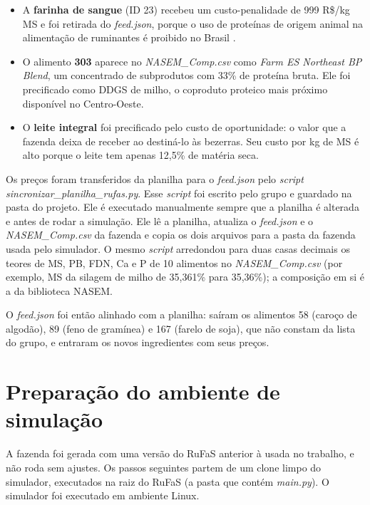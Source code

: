 \documentclass[a4paper,12pt]{article}
\begin{document}
\begin{itemize}
    \item A \textbf{farinha de sangue} (ID 23) recebeu um custo-penalidade de 999 R\$/kg MS e foi retirada do \textit{feed.json}, porque o uso de proteínas de origem animal na alimentação de ruminantes é proibido no Brasil \cite{website:inmapa}.
    \item O alimento \textbf{303} aparece no \textit{NASEM\_Comp.csv} como \textit{Farm ES Northeast BP Blend}, um concentrado de subprodutos com 33\% de proteína bruta. Ele foi precificado como DDGS de milho, o coproduto proteico mais próximo disponível no Centro-Oeste.
    \item O \textbf{leite integral} foi precificado pelo custo de oportunidade: o valor que a fazenda deixa de receber ao destiná-lo às bezerras. Seu custo por kg de MS é alto porque o leite tem apenas 12,5\% de matéria seca.
\end{itemize}

Os preços foram transferidos da planilha para o \textit{feed.json} pelo \textit{script sincronizar\_\allowbreak planilha\_\allowbreak rufas.py}. Esse \textit{script} foi escrito pelo grupo e guardado na pasta do projeto. Ele é executado manualmente sempre que a planilha é alterada e antes de rodar a simulação. Ele lê a planilha, atualiza o \textit{feed.json} e o \textit{NASEM\_Comp.csv} da fazenda e copia os dois arquivos para a pasta da fazenda usada pelo simulador. O mesmo \textit{script} arredondou para duas casas decimais os teores de MS, PB, FDN, Ca e P de 10 alimentos no \textit{NASEM\_Comp.csv} (por exemplo, MS da silagem de milho de 35,361\% para 35,36\%); a composição em si é a da biblioteca NASEM.

O \textit{feed.json} foi então alinhado com a planilha: saíram os alimentos 58 (caroço de algodão), 89 (feno de gramínea) e 167 (farelo de soja), que não constam da lista do grupo, e entraram os novos ingredientes com seus preços.

\section{Preparação do ambiente de simulação}\label{sec:preparacao}

A fazenda foi gerada com uma versão do RuFaS anterior à usada no trabalho, e não roda sem ajustes. Os passos seguintes partem de um clone limpo do simulador, executados na raiz do RuFaS (a pasta que contém \textit{main.py}). O simulador foi executado em ambiente Linux.
\end{document}

